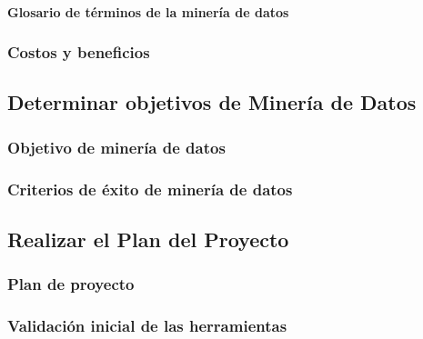         \paragraph{Glosario de términos de la minería de datos}
    \subsubsection{Costos y beneficios}
\subsection{Determinar objetivos de Minería de Datos}
    \subsubsection{Objetivo de minería de datos}
    \subsubsection{Criterios de éxito de minería de datos}
\subsection{Realizar el Plan del Proyecto}
    \subsubsection{Plan de proyecto}
    \subsubsection{Validación inicial de las herramientas}